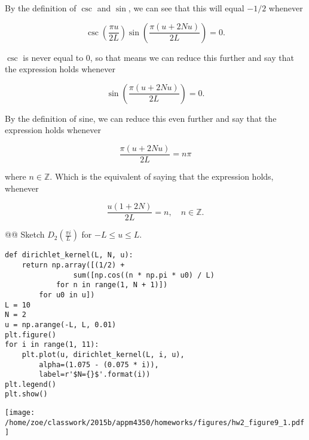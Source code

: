 \documentclass[10pt]{article}
\begin{document}
\begin{easylist}[enumerate]
    By the definition of $\csc$ and $\sin$, we can see that this will equal $-1/2$ whenever

    \[
        \csc\left( \frac{\pi u}{2L} \right) \sin\left( \frac{\pi (u + 2Nu)}{2L}\right) = 0.
    \]

    $\csc$ is never equal to 0, so that means we can reduce this further and say that the expression holds whenever

    \[
        \sin\left( \frac{\pi (u + 2Nu)}{2L}\right) = 0.
    \]

    By the definition of sine, we can reduce this even further and say that the expression holds whenever

    \[
        \frac{\pi (u + 2Nu)}{2L} = n \pi
    \]

    where $n \in \mathbb{Z}$. Which is the equivalent of saying that the expression holds, whenever

    \[
        \frac{u(1 + 2N)}{2L} = n, \quad n \in \mathbb{Z}.
    \]

    @@ Sketch $D_2\left( \frac{ \pi i }{L} \right)$ for $-L \le u \le L$.

    \weave

\begin{verbatim}
def dirichlet_kernel(L, N, u):
    return np.array([(1/2) +
                sum([np.cos((n * np.pi * u0) / L)
            for n in range(1, N + 1)])
        for u0 in u])
L = 10
N = 2
u = np.arange(-L, L, 0.01)
plt.figure()
for i in range(1, 11):
    plt.plot(u, dirichlet_kernel(L, i, u),
        alpha=(1.075 - (0.075 * i)),
        label=r'$N={}$'.format(i))
plt.legend()
plt.show()
\end{verbatim}
\texttt{[image: /home/zoe/classwork/2015b/appm4350/homeworks/figures/hw2\_figure9\_1.pdf]}

    \noweave

\end{easylist}
\end{document}
